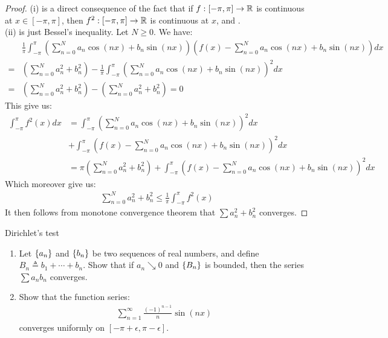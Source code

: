 \documentclass{report}
\begin{document}
\begin{proof}
  (i) is a direct consequence of the fact that if $f:[-\pi ,\pi ]\rightarrow \mathbb{R}$ is continuous at $x\in [-\pi ,\pi ]$, then $f^2:[-\pi ,\pi ]\rightarrow \mathbb{R}$ is continuous at $x$, and .  \\

(ii) is just Bessel's inequality. Let $N\geq 0$. We have: 
\begin{align*}
&\frac{1}{\pi }\int_{-\pi }^{\pi } \left(\sum_{n=0}^N a_n \cos (nx)+ b_n \sin (nx)  \right) \left(f(x) - \sum_{n=0}^N a_n\cos (nx)+b_n \sin (nx)  \right) dx \\
  =& \left(\sum_{n=0}^N a_n^2 + b_n^2\right) - \frac{1}{\pi } \int_{-\pi}^{\pi } \left(\sum_{n=0}^N a_n \cos (nx)+ b_n \sin (nx)     \right)^2 dx \\
  =&   \left(\sum_{n=0}^N a_n^2 + b_n^2\right)  -  \left(\sum_{n=0}^N a_n^2 + b_n^2\right) =0 
\end{align*}
This give us: 
\begin{align*}
  \int_{-\pi }^{\pi } f^2(x)dx&= \int_{-\pi }^{\pi }  \left(\sum_{n=0}^N a_n\cos (nx) + b_n \sin (nx)\right)^2 dx \\
  & + \int_{-\pi }^\pi    \left(f(x) - \sum_{n=0}^N a_n\cos (nx)+b_n \sin (nx)  \right)^2 dx \\
  &= \pi  \left(\sum_{n=0}^N a_n^2 +b_n^2 \right) +   \int_{-\pi }^\pi    \left(f(x) - \sum_{n=0}^N a_n\cos (nx)+b_n \sin (nx)  \right)^2 dx 
\end{align*}
Which moreover give us: 
\begin{align*}
\sum_{n=0}^N a_n^2 + b_n^2 \leq \frac{1}{\pi } \int_{-\pi }^{\pi }f^2(x)
\end{align*}
It then follows from monotone convergence theorem that $\sum a_n^2+b_n^2$ converges. 
\end{proof}
\begin{question}{Dirichlet's test}{}
\begin{enumerate}[label=(\roman*)]
  \item Let $\left\{ a_n \right\}$ and $\left\{ b_n \right\}$ be two sequences of real numbers, and define $B_n\triangleq b_1 + \cdots +b_n$. Show that if $a_n\searrow 0$ and  $\left\{ B_n \right\}$ is bounded, then the series $\sum a_nb_n$ converges. 
  \item Show that the function series: 
    \begin{align*}
    \sum_{n=1}^{\infty} \frac{(-1)^{n-1}}{n} \sin (nx)
    \end{align*}
    converges uniformly on $[-\pi +\epsilon ,\pi -\epsilon ]$. 
\end{enumerate}
\end{question}
\end{document}
